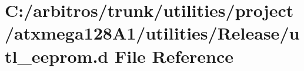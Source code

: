 \hypertarget{utilities_2project_2atxmega128_a1_2utilities_2_release_2utl__eeprom_8d}{\section{C\-:/arbitros/trunk/utilities/project/atxmega128\-A1/utilities/\-Release/utl\-\_\-eeprom.d File Reference}
\label{utilities_2project_2atxmega128_a1_2utilities_2_release_2utl__eeprom_8d}
}
